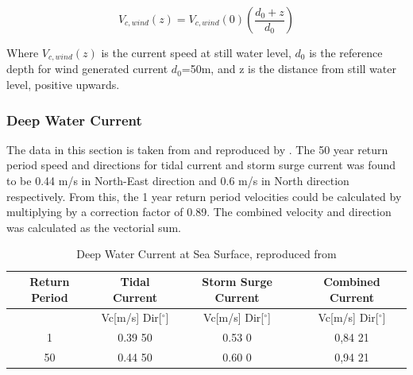   \begin{equation}
      V_{c,wind}(z)= V_{c,wind}(0) \left( \frac{d_0+z}{d_0}\right)
  \end{equation}
  
  \noindent Where $ V_{c,wind}(z)$ is the current speed at still water level, $d_0$ is the reference depth for wind generated current $d_0$=50m, and z is the distance from still water level, positive upwards. \newline
  \newline
  
\subsubsection{Deep Water Current } 
   The data in this section is taken from \cite{hseenironmental} and reproduced by \cite{Lifes50+D1.1}.\newline
   \newline
   The 50 year return period speed and directions for tidal current and storm surge current was found to be 0.44 m/s in North-East direction and 0.6 m/s in North direction respectively. From this, the 1 year return period velocities could be calculated by multiplying by a correction factor of 0.89. The combined velocity and direction was calculated as the vectorial sum.
   
   
\begin{table} [H]
\centering
\begin{tabular}{ |c|c|c|c|}
\hline
Return Period & Tidal Current & Storm Surge Current & Combined Current \\
 \hline
 \hline
 & Vc[m/s] \hspace{0.3cm} Dir[$^{\circ}$] &  Vc[m/s] \hspace{0.3cm} Dir[$^{\circ}$] & Vc[m/s] \hspace{0.3cm} Dir[$^{\circ}$] \\
 \hline
 1 & 0.39 \hspace{0.7cm} 50 & 0.53 \hspace{0.7cm} 0  & 0,84 \hspace{0.7cm} 21 \\
 50 & 0.44 \hspace{0.7cm} 50 & 0.60 \hspace{0.7cm} 0  & 0,94 \hspace{0.7cm} 21 \\
 \hline
\end{tabular}
\caption{Deep Water Current at Sea Surface, reproduced from \cite{Lifes50+D1.1}}
\label{table:tidcur}
\end{table} 


